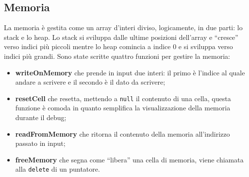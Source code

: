 \documentclass[../main.tex]{subfiles}
\begin{document}
\subsection{Memoria}
La memoria \`e gestita come un array d'interi diviso, logicamente, in due parti: lo stack e lo heap. Lo stack si sviluppa dalle ultime posizioni dell'array e ``cresce'' verso indici pi\`u piccoli mentre lo heap comincia a indice 0 e si sviluppa verso indici pi\`u grandi. Sono state scritte quattro funzioni per gestire la memoria:
\begin{itemize}
    \item \textbf{writeOnMemory} che prende in input due interi: il primo \`e l'indice al quale andare a scrivere e il secondo \`e il dato da scrivere;
    \item \textbf{resetCell} che resetta, mettendo a \verb|null| il contenuto di una cella, questa funzione \`e comoda in quanto semplifica la visualizzazione della memoria durante il debug;
    \item \textbf{readFromMemory} che ritorna il contenuto della memoria all'indirizzo passato in input;
    \item \textbf{freeMemory} che segna come ``libera'' una cella di memoria, viene chiamata alla \verb|delete| di un puntatore.
\end{itemize}
\end{document}
